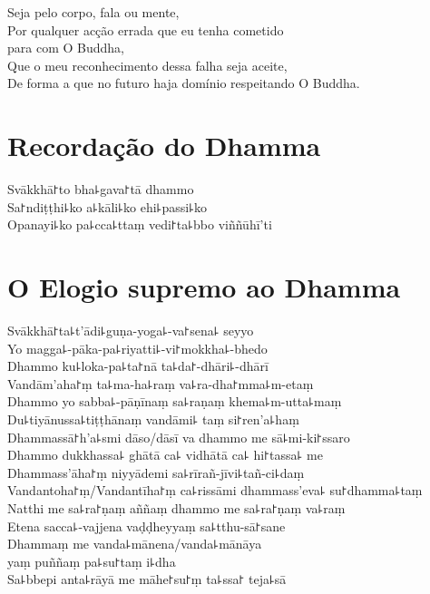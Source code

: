 Seja pelo corpo, fala ou mente,\\
Por qualquer acção errada que eu tenha cometido\\
\vin para com O Buddha,\\
Que o meu reconhecimento dessa falha seja aceite,\\
De forma a que no futuro haja domínio respeitando O Buddha.

\clearpage

\chapter*{Recordação do Dhamma}

\delegateSetUseNext

\begin{leader}
\end{leader}

Svākkhā꜓to bha꜕gava꜓tā dhammo\\
Sa꜓ndiṭṭhi꜕ko a꜕kāli꜕ko ehi꜕passi꜕ko\\
Opanayi꜕ko pa꜕cca꜕ttaṃ vedi꜓ta꜕bbo viññūhī'ti

\chapter*{O Elogio supremo ao Dhamma}

\begin{leader}
\end{leader}

Svākkhā꜓ta꜕t'ādi꜕guṇa-yoga꜕-va꜓sena꜕ seyyo\\
Yo magga꜕-pāka-pa꜕riyatti꜕-vi꜓mokkha꜕-bhedo\\
Dhammo ku꜕loka-pa꜕ta꜓nā ta꜕da꜓-dhāri꜕-dhārī\\
Vandām'aha꜓ṃ ta꜕ma-ha꜕raṃ va꜕ra-dha꜓mma꜕m-etaṃ\\
Dhammo yo sabba꜕-pāṇīnaṃ sa꜕raṇaṃ khema꜕m-utta꜕maṃ\\
Du꜕tiyānussa꜕tiṭṭhānaṃ vandāmi꜕ taṃ si꜓ren'a꜕haṃ\\
Dhammassā꜓h'a꜕smi dāso/dāsī va dhammo me sā꜕mi-ki꜓ssaro\\
Dhammo dukkhassa꜕ ghātā ca꜕ vidhātā ca꜕ hi꜓tassa꜕ me\\
Dhammass'āha꜓ṃ niyyādemi sa꜕rīrañ-jīvi꜕tañ-ci꜕daṃ\\
Vandantoha꜓ṃ/Vandantīha꜓ṃ ca꜕rissāmi dhammass'eva꜕ su꜓dhamma꜕taṃ\\
Natthi me sa꜕ra꜓ṇaṃ aññaṃ dhammo me sa꜕ra꜓ṇaṃ va꜕raṃ\\
Etena sacca꜕-vajjena vaḍḍheyyaṃ sa꜕tthu-sā꜓sane\\
Dhammaṃ me vanda꜕mānena/vanda꜕mānāya\\
\vin yaṃ puññaṃ pa꜕su꜓taṃ i꜕dha\\
Sa꜕bbepi anta꜕rāyā me māhe꜓su꜓ṃ ta꜕ssa꜓ teja꜕sā

